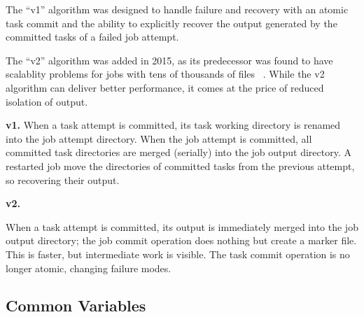 \documentclass[format=acmsmall, screen=true, nonacm, timestamp, review=false]{acmart}
\begin{document}
The ``v1'' algorithm was designed to handle failure and recovery with an
atomic task commit and the ability to explicitly recover the output generated
by the committed tasks of a failed job attempt.

The ``v2'' algorithm was added in 2015, as its predecessor was found
to have scalablity problems for jobs with tens of thousands of files
\ \cite{MAPREDUCE-4815}.
While the v2 algorithm can deliver better performance, it comes at the price of
reduced isolation of output.

\textbf{v1.}
When a task attempt is committed, its task working directory is renamed into
the job attempt directory.
When the job attempt is committed, all committed task directories are merged
(serially) into the job output directory.
A restarted job move the directories of committed tasks from the previous
attempt, so recovering their output.


\textbf{v2.}

When a task attempt is committed, its output is immediately merged into the
job output directory;
the job commit operation does nothing but create a marker file.
This is faster, but intermediate work is visible.
The task commit operation is no longer atomic, changing failure modes.


\subsection{Common Variables}
\label{subsec:common-variables}
\end{document}
